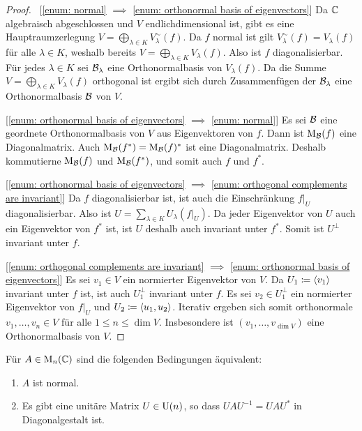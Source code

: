 \begin{proof}\,
  [\ref{enum: normal} $\implies$ \ref{enum: orthonormal basis of eigenvectors}]
    Da $\mathbb{C}$ algebraisch abgeschlossen und $V$ endlichdimensional ist, gibt es eine Hauptraumzerlegung $V = \bigoplus_{\lambda \in K} V^\sim_\lambda(f)$.
    Da $f$ normal ist gilt $V^\sim_\lambda(f) = V_\lambda(f)$ für alle $\lambda \in K$, weshalb bereits $V = \bigoplus_{\lambda \in K} V_\lambda(f)$.
    Also ist $f$ diagonalisierbar.
    Für jedes $\lambda \in K$ sei $\mathcal{B}_\lambda$ eine Orthonormalbasis von $V_\lambda(f)$.
    Da die Summe $V = \bigoplus_{\lambda \in K} V_\lambda(f)$ orthogonal ist ergibt sich durch Zusammenfügen der $\mathcal{B}_\lambda$ eine Orthonormalbasis $\mathcal{B}$ von $V$.
    
  [\ref{enum: orthonormal basis of eigenvectors} $\implies$ \ref{enum: normal}]
    Es sei $\mathcal{B}$ eine geordnete Orthonormalbasis von $V$ aus Eigenvektoren von $f$.
    Dann ist $\mathrm{M}_{\mathcal{B}}(f)$ eine Diagonalmatrix.
    Auch $\mathrm{M}_{\mathcal{B}}(f^*) = \mathrm{M}_{\mathcal{B}}(f)^*$ ist eine Diagonalmatrix.
    Deshalb kommutierne $\mathrm{M}_{\mathcal{B}}(f)$ und $\mathrm{M}_{\mathcal{B}}(f^*)$, und somit auch $f$ und $f^*$.
    
  [\ref{enum: orthonormal basis of eigenvectors} $\implies$ \ref{enum: orthogonal complements are invariant}]
    Da $f$ diagonalisierbar ist, ist auch die Einschränkung $f|_U$ diagonalisierbar.
    Also ist $U = \sum_{\lambda \in K} U_\lambda(f|_U)$.
    Da jeder Eigenvektor von $U$ auch ein Eigenvektor von $f^*$ ist, ist $U$ deshalb auch invariant unter $f^*$.
    Somit ist $U^\perp$ invariant unter $f$.
    
  [\ref{enum: orthogonal complements are invariant} $\implies$ \ref{enum: orthonormal basis of eigenvectors}]
    Es sei $v_1 \in V$ ein normierter Eigenvektor von $V$.
    Da $U_1 \coloneqq \left\langle v_1 \right\rangle$ invariant unter $f$ ist, ist auch $U_1^\perp$ invariant unter $f$.
    Es sei $v_2 \in U_1^\perp$ ein normierter Eigenvektor von $f|_U$ und $U_2 \coloneqq \left\langle u_1, u_2 \right\rangle$.
    Iterativ ergeben sich somit orthonormale $v_1, \dotsc, v_n \in V$ für alle $1 \leq n \leq \dim V$.
    Insbesondere ist $(v_1, \dotsc, v_{\dim V})$ eine Orthonormalbasis von $V$.
\end{proof}



\begin{corollary}
  Für $A \in \mathrm{M}_n(\mathbb{C})$ sind die folgenden Bedingungen äquivalent:
  \begin{enumerate}[leftmargin=*, label=\roman*)]
    \item
      $A$ ist normal.
    \item
      Es gibt eine unitäre Matrix $U \in \mathrm{U}(n)$, so dass $U\!A U^{-1} = U\!A U^*$ in Diagonalgestalt ist.
  \end{enumerate}
\end{corollary}


